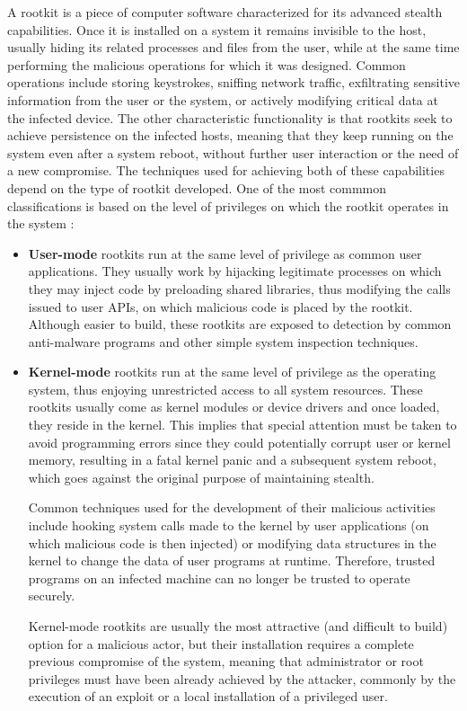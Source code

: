 A rootkit is a piece of computer software characterized for its advanced
stealth capabilities. Once it is installed on a system it remains invisible
to the host, usually hiding its related processes and files from the user,
while at the same time performing the malicious operations for which it was
designed. Common operations include storing keystrokes, sniffing network
traffic, exfiltrating sensitive information from the user or the system, or
actively modifying critical data at the infected device. The other
characteristic functionality is that rootkits seek to achieve persistence
on the infected hosts, meaning that they keep running on the system even
after a system reboot, without further user interaction or the need of a
new compromise. The techniques used for achieving both of these
capabilities depend on the type of rootkit developed. One of the most
commmon classifications is based on the level of privileges on which the
rootkit operates in the system \cite{rootkit_ptsecurity}:
\begin{itemize}
\item \textbf{User-mode} rootkits run at the same level of privilege as
common user applications. They usually work by hijacking legitimate
processes on which they may inject code by preloading shared libraries,
thus modifying the calls issued to user APIs, on which malicious code is
placed by the rootkit. Although easier to build, these rootkits are exposed
to detection by common anti-malware programs and other simple system
inspection techniques.
\item \textbf{Kernel-mode} rootkits run at the same level of privilege as
the operating system, thus enjoying unrestricted access to all system
resources. These rootkits usually come as kernel modules or device drivers
and once loaded, they reside in the kernel. This implies that special
attention must be taken to avoid programming errors since they could
potentially corrupt user or kernel memory, resulting in a fatal kernel
panic and a subsequent system reboot, which goes against the original
purpose of maintaining stealth.

Common techniques used for the development of their malicious activities
include hooking system calls made to the kernel by user applications (on
which malicious code is then injected) or modifying data structures in the
kernel to change the data of user programs at runtime. Therefore, trusted
programs on an infected machine can no longer be trusted to operate securely.

Kernel-mode rootkits are usually the most attractive (and difficult to
build) option for a malicious actor, but their installation requires a
complete previous compromise of the system, meaning that administrator or
root privileges must have been already achieved by the attacker, commonly
by the execution of an exploit or a local installation of a privileged user.
\end{itemize}

